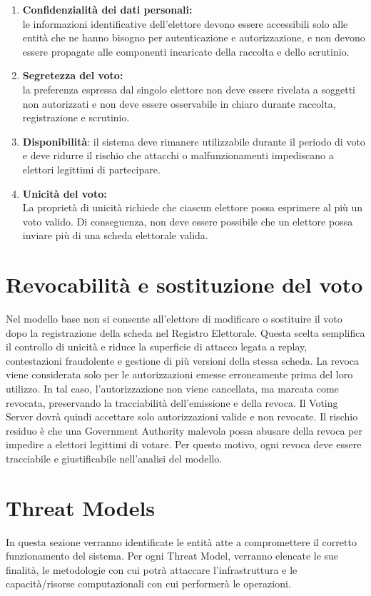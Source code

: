 \documentclass[a4paper,12pt]{article}
\begin{document}
\begin{enumerate}
        \item \textbf{Confidenzialità dei dati personali:}\\le informazioni identificative dell'elettore devono essere accessibili solo alle entità che ne hanno bisogno per autenticazione
        e autorizzazione, e non devono essere propagate alle componenti incaricate della raccolta e dello scrutinio.
        \item \textbf{Segretezza del voto:}\\la preferenza espressa dal singolo elettore non deve essere rivelata a soggetti non autorizzati 
        e non deve essere osservabile in chiaro durante raccolta, registrazione e scrutinio.
        \item \textbf{Disponibilità}: il sistema deve rimanere utilizzabile durante il periodo di voto e deve ridurre
        il rischio che attacchi o malfunzionamenti impediscano a elettori legittimi di partecipare.
        \item \textbf{Unicità del voto:}\\ La proprietà di unicità richiede che ciascun elettore possa esprimere al più un voto valido. Di conseguenza, non deve essere possibile che un elettore possa inviare più di una scheda elettorale valida.        
    \end{enumerate}
\section{Revocabilità e sostituzione del voto}
    Nel modello base non si consente all'elettore di modificare o sostituire il voto dopo la registrazione della scheda nel Registro Elettorale. Questa scelta semplifica il controllo di unicità e riduce la superficie di attacco legata a replay, contestazioni fraudolente e gestione di più versioni della stessa scheda.
    La revoca viene considerata solo per le autorizzazioni emesse erroneamente prima del loro utilizzo. In tal caso, l'autorizzazione non viene cancellata, ma marcata come revocata, preservando la tracciabilità dell'emissione e della revoca. 
    Il Voting Server dovrà quindi accettare solo autorizzazioni valide e non revocate.
    Il rischio residuo è che una Government Authority malevola possa abusare della revoca per impedire a elettori legittimi di votare. Per questo motivo, ogni revoca deve essere tracciabile e giustificabile nell'analisi del modello.
\section{Threat Models}
In questa sezione verranno identificate le entità atte a compromettere il corretto funzionamento del sistema.
Per ogni Threat Model, verranno elencate le sue finalità, le metodologie con cui potrà attaccare l'infrastruttura e le capacità/risorse computazionali con cui performerà le operazioni.
\end{document}
